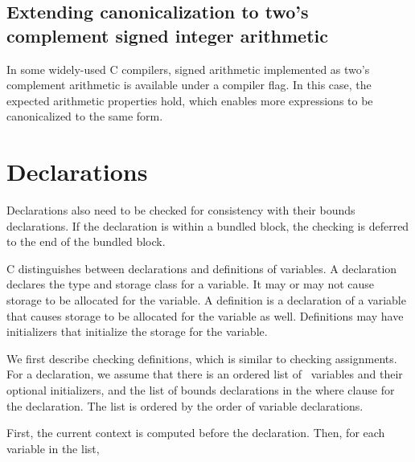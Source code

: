 \subsection{Extending canonicalization to two's complement signed integer arithmetic}

In some widely-used C compilers, signed arithmetic implemented
as two's complement arithmetic is available under a compiler flag. In
this case, the expected arithmetic properties hold, which enables more
expressions to be canonicalized to the same form.

\section{Declarations}
\label{section:checking-declarations}

Declarations also need to be checked for consistency with their bounds
declarations. If the declaration is within a bundled block, the checking
is deferred to the end of the bundled block.

C distinguishes between declarations and definitions of variables. A
declaration declares the type and storage class for a variable. It may
or may not cause storage to be allocated for the variable. A definition
is a declaration of a variable that causes storage to be allocated for
the variable as well. Definitions may have initializers that initialize
the storage for the variable.

We first describe checking definitions, which is similar to checking
assignments. For a declaration, we assume that there is an ordered list of
\arrayptr\ variables and their optional initializers, and the
list of bounds declarations in the where clause for the declaration. The
list is ordered by the order of variable declarations.

First, the current context is computed before the declaration. Then, for
each variable  in the list,

